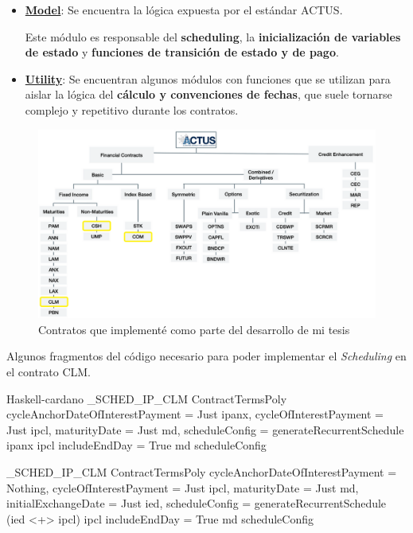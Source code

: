 \documentclass{beamer}
\newcommand{\nologo}{\setbeamertemplate{logo}{}} %
\begin{document}
\begin{frame}
    \begin{itemize}
        \item \textbf{\underline{Model}}: Se encuentra la lógica expuesta por el estándar ACTUS. 

            \medskip

            Este módulo es responsable del \textbf{scheduling}, la \textbf{inicialización de variables de estado} y \textbf{funciones de transición de estado y de pago}.

            \vfill
            \pause

        \item \textbf{\underline{Utility}}: Se encuentran algunos módulos con funciones que se utilizan para aislar la lógica del \textbf{cálculo y convenciones de fechas}, que suele tornarse complejo y repetitivo durante los contratos.
    \end{itemize}
\end{frame}

{\nologo
\begin{frame}[fragile]
\begin{figure}[H]
    \centering
    \includegraphics[width=\textwidth]{ACTUS_Taxonomy_hl.png}
    \caption{Contratos que implementé como parte del desarrollo de mi tesis}
\end{figure}

\end{frame}
}

{\nologo
\begin{frame}[fragile]
Algunos fragmentos del código necesario para poder implementar el \textit{Scheduling} en el contrato CLM.

\begin{code}{Haskell-cardano}
_SCHED_IP_CLM
  ContractTermsPoly
    { cycleAnchorDateOfInterestPayment = Just ipanx,
      cycleOfInterestPayment = Just ipcl,
      maturityDate = Just md,
      scheduleConfig
    } = generateRecurrentSchedule ipanx ipcl {includeEndDay = True} md scheduleConfig

_SCHED_IP_CLM
  ContractTermsPoly
    { cycleAnchorDateOfInterestPayment = Nothing,
      cycleOfInterestPayment = Just ipcl,
      maturityDate = Just md,
      initialExchangeDate = Just ied,
      scheduleConfig
    } = generateRecurrentSchedule (ied <+> ipcl) ipcl {includeEndDay = True} md scheduleConfig
\end{code}

\end{frame}
}
\end{document}
